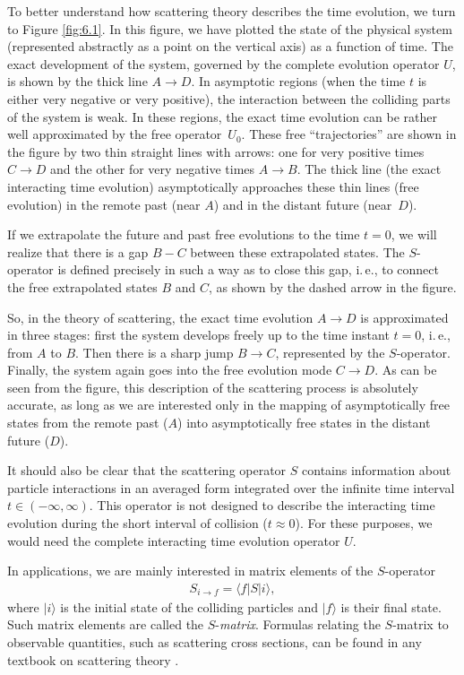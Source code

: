 \documentclass[]{stefan1}
\begin{document}
To better understand how scattering theory describes the time evolution,
we turn to Figure \ref{fig:6.1}. In this figure, we have plotted the
state of the physical system (represented abstractly as a point on the
vertical axis) as a function of time. The exact development of the
system, governed by the complete evolution operator $ U $, is shown by
the thick line $ A \to D $. In asymptotic regions (when the time $ t $
is either very negative or very positive), the interaction between the
colliding parts of the system is weak. In these regions, the exact time
evolution can be rather well approximated by the free
operator~$ U_{0} $. These free ``trajectories'' are shown in the figure by two
thin straight lines with arrows: one for very positive times
$ C \to D $ and the other for very negative times $ A \to B $. The thick
line (the exact interacting time evolution) asymptotically approaches
these thin lines (free evolution) in the remote past (near $ A $) and
in the distant future (near~$ D $).

If we extrapolate the future and past free evolutions to the time
$ t = 0 $, we will realize that there is a gap $ B-C $ between these
extrapolated states. The $ S $-operator is defined precisely in such a
way as to close this gap, i.\,e., to connect the free extrapolated states
$ B $ and $ C $, as shown by the dashed arrow in the figure.

So, in the theory of scattering, the exact time evolution $ A \to D $
is approximated in three stages: first the system develops freely up to
the time instant $ t = 0 $, i.\,e., from $ A $ to $ B $. Then there is a
sharp jump $ B \to C $, represented by the $ S $-operator. Finally, the
system again goes into the free evolution mode $ C \to D $. As can be
seen from the figure, this description of the scattering process is
absolutely accurate, as long as we are interested only in the mapping
of asymptotically free states from the remote past ($ A $) into
asymptotically free states in the distant future ($ D $).

It should also be clear that the scattering operator $ S $ contains
information about particle interactions in an averaged form integrated
over the infinite time interval $ t \in (- \infty , \infty ) $. This
operator is not designed to describe the interacting time evolution
during the short interval of collision ($ t \approx 0 $). For these
purposes, we would need the complete interacting time evolution operator
$ U $.

In applications, we are mainly interested in matrix elements of the
$ S $-operator
%
\begin{align}
S_{i \to f} = \langle f | S | i \rangle , \label{eq:8.62}
\end{align}
where $| i \rangle $ is the initial state of the colliding particles and
$|f \rangle $ is their final state. Such matrix elements are called the
$ S$-\emph{matrix}.  Formulas relating the $ S $-matrix to
observable quantities, such as scattering cross sections, can be found
in any textbook on scattering theory \cite{Goldberger,Taylor}.
\end{document}
